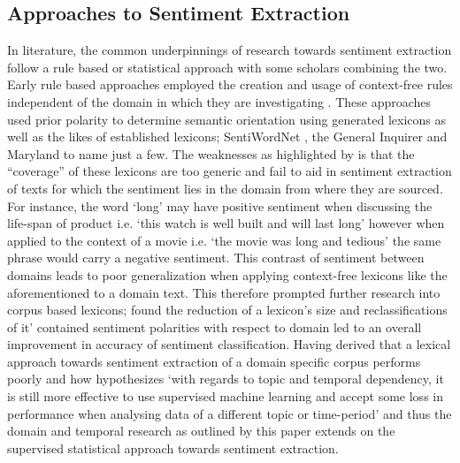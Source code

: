 \documentclass[11pt]{report}
\begin{document}
\subsection*{Approaches to Sentiment Extraction}
In literature, the common underpinnings of research towards sentiment extraction follow a rule based or statistical approach with some scholars combining the two. Early rule based approaches employed the creation and usage of context-free rules independent of the domain in which they are investigating \citep{read_weakly_2009}. These approaches used prior polarity to determine semantic orientation using generated lexicons \citep{TaboadaLexiconbasedMethodsSentiment2011} as well as the likes of established lexicons; SentiWordNet \citep{esuli_sentiwordnet:_2006}, the General Inquirer \citep{stone_computer_1963} and Maryland \citep{mohammad_generating_2009} to name just a few. The weaknesses as highlighted by \cite{TaboadaLexiconbasedMethodsSentiment2011} is that the ``coverage'' of these lexicons are too generic and fail to aid in sentiment extraction of texts for which the sentiment lies in the domain from where they are sourced. For instance, the word `long' may have positive sentiment when discussing the life-span of product i.e. `this watch is well built and will last long' however when applied to the context of a movie i.e. `the movie was long and tedious' the same phrase would carry a negative sentiment. This contrast of sentiment between domains leads to poor generalization when applying context-free lexicons like the aforementioned to a domain text. This therefore prompted further research into corpus based lexicons; \cite{cho_data-driven_2014} found the reduction of a lexicon's size and reclassifications of it' contained sentiment polarities with respect to domain led to an overall improvement in accuracy of sentiment classification. Having derived that a lexical approach towards sentiment extraction of a domain specific corpus performs poorly and how \cite{read_weakly_2009} hypothesizes `with regards to topic and temporal dependency, it is still more effective to use supervised machine learning and accept some loss in performance when analysing data of a different topic or time-period' and thus the domain and temporal research as outlined by this paper extends on the supervised statistical approach towards sentiment extraction.
\end{document}
